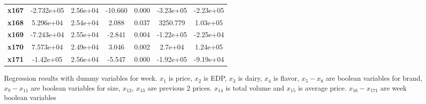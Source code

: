 \documentclass{article}
\begin{document}
\begin{center}
{\begin{tabular}{lcccccc}
\textbf{x167}  &   -2.732e+05  &     2.56e+04     &   -10.660  &         0.000        &    -3.23e+05    &    -2.23e+05     \\
\textbf{x168}  &    5.296e+04  &     2.54e+04     &     2.088  &         0.037        &     3250.779    &     1.03e+05     \\
\textbf{x169}  &   -7.243e+04  &     2.55e+04     &    -2.841  &         0.004        &    -1.22e+05    &    -2.25e+04     \\
\textbf{x170}  &    7.573e+04  &     2.49e+04     &     3.046  &         0.002        &      2.7e+04    &     1.24e+05     \\
\textbf{x171}  &    -1.42e+05  &     2.56e+04     &    -5.547  &         0.000        &    -1.92e+05    &    -9.19e+04     \\
\bottomrule
\end{tabular}}
\caption{Regression results with dummy variables for week. $x_1$ is price, $x_2$ is EDP, $x_3$ is dairy, $x_4$ is flavor, $x_5-x_8$ are boolean variables for brand, $x_9-x_{11}$ are boolean variables for size, $x_{12}$, $x_{13}$ are previous 2 prices. $x_{14}$ is total volume and $x_{15}$ is average price. $x_{16}-x_{171}$ are week boolean variables}
\end{center}
\end{document}
